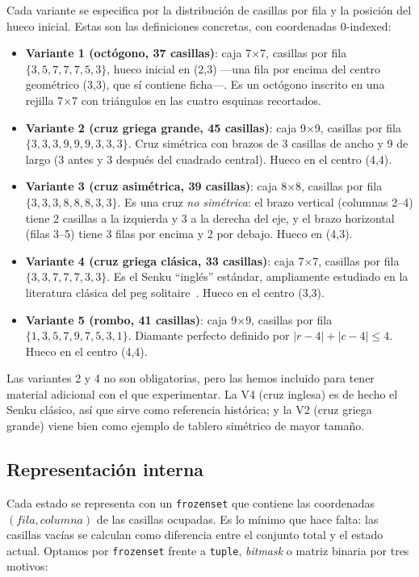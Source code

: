 \documentclass[conference,a4paper]{IEEEtran}
\begin{document}
Cada variante se especifica por la distribución de casillas por fila y la
posición del hueco inicial. Estas son las definiciones concretas, con
coordenadas 0-indexed:

\begin{itemize}
\item \textbf{Variante 1 (octógono, 37 casillas)}: caja 7$\times$7, casillas
  por fila $\{3,5,7,7,7,5,3\}$, hueco inicial en (2,3) ---una fila por encima
  del centro geométrico (3,3), que sí contiene ficha---. Es un octógono
  inscrito en una rejilla 7$\times$7 con triángulos en las cuatro esquinas
  recortados.
\item \textbf{Variante 2 (cruz griega grande, 45 casillas)}: caja
  9$\times$9, casillas por fila $\{3,3,3,9,9,9,3,3,3\}$. Cruz simétrica
  con brazos de 3 casillas de ancho y 9 de largo (3 antes y 3 después del
  cuadrado central). Hueco en el centro (4,4).
\item \textbf{Variante 3 (cruz asimétrica, 39 casillas)}: caja 8$\times$8,
  casillas por fila $\{3,3,3,8,8,8,3,3\}$. Es una cruz \emph{no simétrica}:
  el brazo vertical (columnas 2--4) tiene 2 casillas a la izquierda y 3 a
  la derecha del eje, y el brazo horizontal (filas 3--5) tiene 3 filas por
  encima y 2 por debajo. Hueco en (4,3).
\item \textbf{Variante 4 (cruz griega clásica, 33 casillas)}: caja
  7$\times$7, casillas por fila $\{3,3,7,7,7,3,3\}$. Es el Senku
  ``inglés'' estándar, ampliamente estudiado en la literatura clásica del
  peg solitaire~\cite{senku-counts}. Hueco en el centro (3,3).
\item \textbf{Variante 5 (rombo, 41 casillas)}: caja 9$\times$9, casillas
  por fila $\{1,3,5,7,9,7,5,3,1\}$. Diamante perfecto definido por
  $|r-4| + |c-4| \leq 4$. Hueco en el centro (4,4).
\end{itemize}

Las variantes 2 y 4 no son obligatorias, pero las hemos incluido para
tener material adicional con el que experimentar. La V4 (cruz inglesa)
es de hecho el Senku clásico, así que sirve como referencia histórica;
y la V2 (cruz griega grande) viene bien como ejemplo de tablero simétrico
de mayor tamaño.


\subsection{Representación interna}

Cada estado se representa con un \texttt{frozenset} que contiene las
coordenadas $(fila, columna)$ de las casillas ocupadas. Es lo mínimo que
hace falta: las casillas vacías se calculan como diferencia entre el
conjunto total y el estado actual. Optamos por \texttt{frozenset} frente a
\texttt{tuple}, \emph{bitmask} o matriz binaria por tres motivos:
\end{document}
